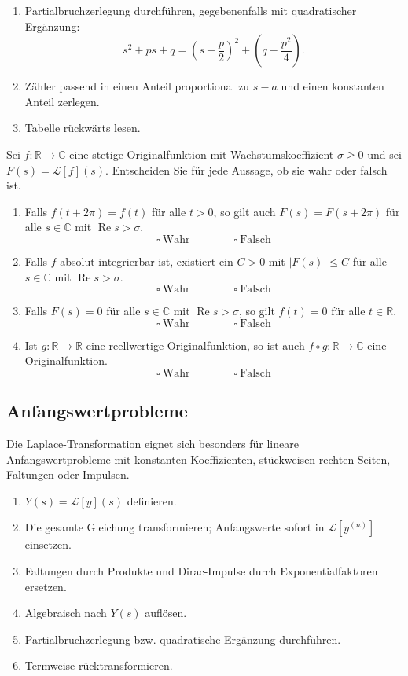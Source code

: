 \documentclass[11pt,a4paper]{article}
\newcommand{\C}{\mathbb C}
\newcommand{\R}{\mathbb R}
\newcommand{\Ree}{\operatorname{Re}}
\newcommand{\1}{\mathbf 1}
\begin{document}
{\begin{kochrezeptbox}[title=Inverse Laplace-Transformation]
\begin{enumerate}
\item Partialbruchzerlegung durchführen, gegebenenfalls mit quadratischer Ergänzung:
\[
s^2+ps+q=\left(s+\frac p2\right)^2+
\left(q-\frac{p^2}{4}\right).
\]
\item Zähler passend in einen Anteil proportional zu $s-a$ und einen konstanten
Anteil zerlegen.
\item Tabelle rückwärts lesen.
\end{enumerate}
\end{kochrezeptbox}

\begin{mcbox}[title=MC-Training: Originalfunktionen und Eindeutigkeit]
Sei $f:\R\to\C$ eine stetige Originalfunktion mit Wachstumskoeffizient
$\sigma\geq0$ und sei $F(s)=\mathcal L[f](s)$. Entscheiden Sie für jede
Aussage, ob sie wahr oder falsch ist.
\begin{enumerate}
\item Falls $f(t+2\pi)=f(t)$ für alle $t>0$, so gilt auch
$F(s)=F(s+2\pi)$ für alle $s\in\C$ mit $\Ree s>\sigma$.
\[
\square\ \text{Wahr}\qquad\qquad\square\ \text{Falsch}
\]
\item Falls $f$ absolut integrierbar ist, existiert ein $C>0$ mit
$|F(s)|\leq C$ für alle $s\in\C$ mit $\Ree s>\sigma$.
\[
\square\ \text{Wahr}\qquad\qquad\square\ \text{Falsch}
\]
\item Falls $F(s)=0$ für alle $s\in\C$ mit $\Ree s>\sigma$, so gilt
$f(t)=0$ für alle $t\in\R$.
\[
\square\ \text{Wahr}\qquad\qquad\square\ \text{Falsch}
\]
\item Ist $g:\R\to\R$ eine reellwertige Originalfunktion, so ist auch
$f\circ g:\R\to\C$ eine Originalfunktion.
\[
\square\ \text{Wahr}\qquad\qquad\square\ \text{Falsch}
\]
\end{enumerate}
\end{mcbox}

\subsection{Anfangswertprobleme}
Die Laplace-Transformation eignet sich besonders für lineare
Anfangswertprobleme mit konstanten Koeffizienten, stückweisen rechten Seiten,
Faltungen oder Impulsen.

\begin{kochrezeptbox}[title=Laplace bei Differentialgleichungen]
\begin{enumerate}
\item $Y(s)=\mathcal L[y](s)$ definieren.
\item Die gesamte Gleichung transformieren; Anfangswerte sofort in
$\mathcal L[y^{(n)}]$ einsetzen.
\item Faltungen durch Produkte und Dirac-Impulse durch Exponentialfaktoren ersetzen.
\item Algebraisch nach $Y(s)$ auflösen.
\item Partialbruchzerlegung bzw. quadratische Ergänzung durchführen.
\item Termweise rücktransformieren.
\end{enumerate}
\end{kochrezeptbox}

}
\end{document}
